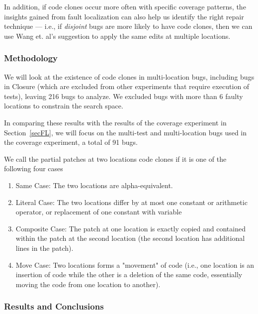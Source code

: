 \documentclass[sigconf, timestamp-false, anonymous=true]{acmart}
\begin{document}
In addition, if code clones occur more often with specific coverage patterns, the insights gained from fault 
localization can also help us identify the right repair technique --- i.e., if \emph{disjoint} bugs are more 
likely to have code clones, then we can use Wang et. al's suggestion to apply the same edits at multiple 
locations.


\subsubsection{Methodology}
We will look at the existence of code clones in multi-location bugs, including bugs in Closure (which are 
excluded from other experiments that require execution of tests), leaving 216 bugs to analyze. We 
excluded bugs with more than 6 faulty locations to constrain the search space.

In comparing these results with the results of the coverage experiment in
Section~\ref{secFL}, we will focus on the multi-test and multi-location bugs used in the coverage 
experiment, a total of 91 bugs.

We call the partial patches at two locations code clones if it is one of the following four cases
\begin{enumerate}
\item Same Case: The two locations are alpha-equivalent. 
\item Literal Case: The two locations differ by at most one constant or arithmetic operator,
 or replacement of one constant with variable 
\item Composite Case: The patch at one location is exactly copied and contained within the patch at the 
second location (the second location  has additional lines in the patch).
\item Move Case: Two locations forms a "movement" of code (i.e., one location is an insertion of code 
while the other is a deletion of the same code, essentially moving the code from one location to another).
\end{enumerate}

\subsubsection{Results and Conclusions}
\end{document}
